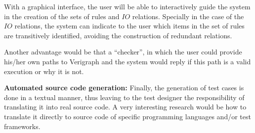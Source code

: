 With a graphical interface, the user will be able to interactively guide the system in the creation of the sets of rules and $IO$ relations. Specially in the case of the $IO$ relations, the system can indicate to the user which items in the set of rules are transitively identified, avoiding the construction of redundant relations.

Another advantage would be that a ``checker'', in which the user could provide his/her own paths to Verigraph and the system would reply if this path is a valid execution or why it is not.

\textbf{Automated source code generation:}
  Finally, the generation of test cases is done in a textual manner, thus leaving to the test designer the responsibility of translating it into real source code. A very interesting research would be how to translate it directly to source code of specific programming languages and/or test frameworks.
